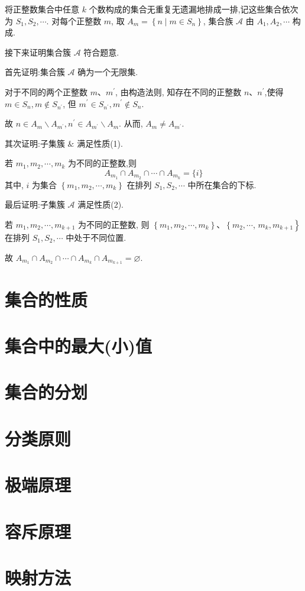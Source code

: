 \begin{solution}
	将正整数集合中任意 $k$ 个数构成的集合无重复无遗漏地排成一排,记这些集合依次为 $S_{1}, S_{2}, \cdots$. 对每个正整数 $m$, 取 $A_{m}=\left\{n \mid m \in S_{n}\right\}$, 集合族 $\mathscr{A}$ 由 $A_{1}, A_{2}, \cdots$ 构成.

	接下来证明集合簇 $\mathscr{A}$ 符合题意.

	首先证明:集合簇 $\mathscr{A}$ 确为一个无限集.

	对于不同的两个正整数 $m 、 m^{\prime}$, 由构造法则, 知存在不同的正整数 $n 、 n^{\prime}$,使得 $m \in S_{n}, m \notin S_{n^{\prime}}$, 但 $m^{\prime} \in S_{n^{\prime}}, m^{\prime} \notin S_{n}$.

	故 $n \in A_{m} \backslash A_{m^{\prime}}, n^{\prime} \in A_{m^{\prime}} \backslash A_{m}$. 从而, $A_{m} \neq A_{m^{\prime}}$.

	其次证明:子集簇 $\&$ 满足性质(1).

	若 $m_{1}, m_{2}, \cdots, m_{k}$ 为不同的正整数,则
	$$
		A_{m_{1}} \cap A_{m_{2}} \cap \cdots \cap A_{m_{k}}=\{i\}
	$$
	其中, $i$ 为集合 $\left\{m_{1}, m_{2}, \cdots, m_{k}\right\}$ 在排列 $S_{1}, S_{2}, \cdots$ 中所在集合的下标.

	最后证明:子集簇 $\mathscr{A}$ 满足性质(2).

	若 $m_{1}, m_{2}, \cdots, m_{k+1}$ 为不同的正整数, 则 $\left\{m_{1}, m_{2}, \cdots, m_{k}\right\} 、\left\{m_{2}, \cdots\right.$, $\left.m_{k}, m_{k+1}\right\}$ 在排列 $S_{1}, S_{2}, \cdots$ 中处于不同位置.

	故 $A_{m_{1}} \cap A_{m_{2}} \cap \cdots \cap A_{m_{k}} \cap A_{m_{k+1}}=\varnothing$.
\end{solution}

\section{集合的性质}
\section{集合中的最大(小)值}
\section{集合的分划}
\section{分类原则}
\section{极端原理}
\section{ 容斥原理}
\section{ 映射方法}